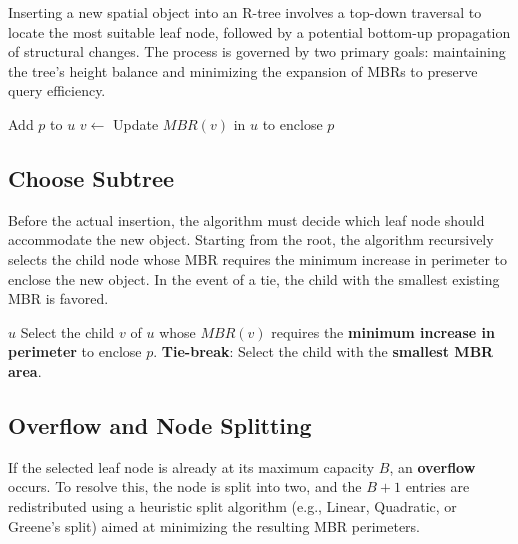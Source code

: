 \documentclass[a4paper, 10pt, titlepage]{report}
\begin{document}
Inserting a new spatial object into an R-tree involves a top-down traversal to locate the most suitable leaf node, followed by a potential bottom-up propagation of structural changes. The process is governed by two primary goals: maintaining the tree's height balance and minimizing the expansion of MBRs to preserve query efficiency.

\begin{algorithm}
\caption{R-Tree Insertion}\label{alg:insertion}
\begin{algorithmic}[1]
        \State Add $p$ to $u$
         
            \State {}
        \EndIf
    \Else
        \State $v \gets$ 
        \State {}
        \State Update $MBR(v)$ in $u$ to enclose $p$
    \EndIf
\EndProcedure
\end{algorithmic}
\end{algorithm}

\subsection{Choose Subtree}
Before the actual insertion, the algorithm must decide which leaf node should accommodate the new object. Starting from the root, the algorithm recursively selects the child node whose MBR requires the minimum increase in perimeter to enclose the new object. In the event of a tie, the child with the smallest existing MBR is favored.

\begin{algorithm}
\caption{ChooseSubtree Algorithm}\label{alg:choose_subtree}
\begin{algorithmic}[1]
    
        \State \Return $u$ 
    \EndIf
    \State Select the child $v$ of $u$ whose $MBR(v)$ requires the \textbf{minimum increase in perimeter} to enclose $p$.
        \State \textbf{Tie-break}: Select the child with the \textbf{smallest MBR area}.
    \EndIf
    \State \Return {}
\EndProcedure
\end{algorithmic}
\end{algorithm}

\subsection{Overflow and Node Splitting}
If the selected leaf node is already at its maximum capacity $B$, an \textbf{overflow} occurs. To resolve this, the node is split into two, and the $B+1$ entries are redistributed using a heuristic split algorithm (e.g., Linear, Quadratic, or Greene's split) aimed at minimizing the resulting MBR perimeters.
\end{document}
